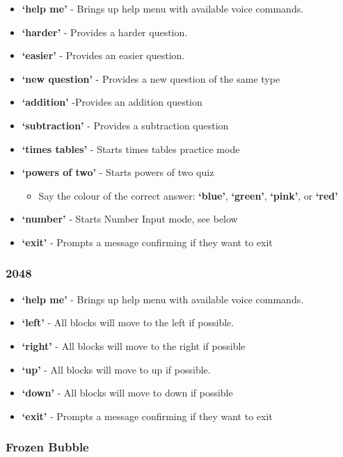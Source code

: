 \documentclass[11pt, oneside]{article}
\begin{document}
\begin{itemize}
  \item {\bf`help me'} - Brings up help menu with available voice commands. 
  \item {\bf`harder'} - Provides a harder question. 
  \item {\bf`easier'} - Provides an easier question.
  \item {\bf`new question'} - Provides a new question of the same type
  \item {\bf`addition'} -Provides an addition question
  \item {\bf`subtraction'} - Provides a subtraction question
  \item {\bf`times tables'} - Starts times tables practice mode
  \item {\bf`powers of two'} - Starts powers of two quiz
  \begin{itemize}
  	\item Say the colour of the correct answer: {\bf`blue'}, {\bf`green'}, {\bf`pink'}, or {\bf`red'}
  \end{itemize}
  \item {\bf`number'} - Starts Number Input mode, see below
  \item {\bf`exit'} - Prompts a message confirming if they want to exit
 
\end{itemize}

\subsubsection{2048}

\begin{itemize}
  	\item {\bf`help me'} - Brings up help menu with available voice commands. 
	\item {\bf`left'} - All blocks will move to the left if possible. 
	\item {\bf`right'} - All blocks will move to the right if possible
	\item {\bf`up'} - All blocks will move to up if possible. 
	\item {\bf`down'} - All blocks will move to down if possible
	\item {\bf`exit'} - Prompts a message confirming if they want to exit
	
\end{itemize}

\subsubsection{Frozen Bubble}
\end{document}
